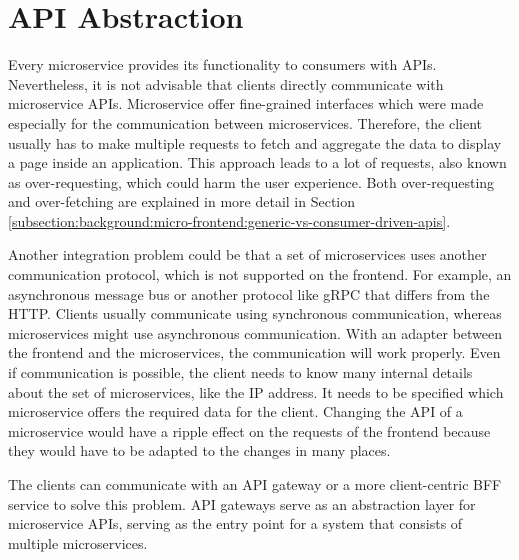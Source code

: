 \section{API Abstraction}\label{section:background:api-abstraction}

Every microservice provides its functionality to consumers with \acp{API}. Nevertheless, it is not advisable that clients directly communicate with microservice \acp{API}. Microservice offer fine-grained interfaces which were made especially for the communication between microservices. Therefore, the client usually has to make multiple requests to fetch and aggregate the data to display a page inside an application. \cite[69]{book:2021:newman:background:bff:micro-services} This approach leads to a lot of requests, also known as over-requesting, which could harm the user experience. \cite[254, 257]{book:2018:richardson:background:bff:microservices-patterns} Both over-requesting and over-fetching are explained in more detail in Section \ref{subsection:background:micro-frontend:generic-vs-consumer-driven-apis}.

\bigskip

\noindent Another integration problem could be that a set of microservices uses another communication protocol, which is not supported on the frontend. For example, an asynchronous message bus or another protocol like \ac{gRPC} that differs from the \ac{HTTP}. Clients usually communicate using synchronous communication, whereas microservices might use asynchronous communication. With an adapter between the frontend and the microservices, the communication will work properly. Even if communication is possible, the client needs to know many internal details about the set of microservices, like the \ac{IP} address. It needs to be specified which microservice offers the required data for the client. Changing the \ac{API} of a microservice would have a ripple effect on the requests of the frontend because they would have to be adapted to the changes in many places. \cite[254-257]{book:2018:richardson:background:bff:microservices-patterns}

\bigskip

\noindent The clients can communicate with an \ac{API} gateway or a more client-centric \ac{BFF} service to solve this problem. \ac{API} gateways serve as an abstraction layer for microservice \acp{API}, serving as the entry point for a system that consists of multiple microservices. \cite[19-20]{book:2020:siriwardena:background:bff:microservice-security-in-action}

